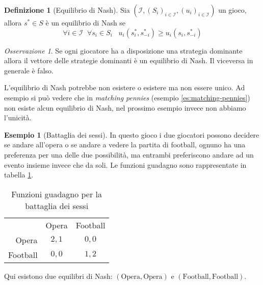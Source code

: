 \documentclass[a4paper]{article}
\theoremstyle{plain}
\theoremstyle{definition}
\newtheorem{mydef}[myteo]{Definizione}
\newtheorem{myes}[myteo]{Esempio}
\theoremstyle{remark}
\newtheorem{myoss}[myteo]{Osservazione}
\newcommand{\pa}[1]{\left(#1\right)}
\begin{document}
\begin{mydef}[Equilibrio di Nash]
  Sia  $\pa{\mathcal{I},\pa{S_i}_{i\in\mathcal{I}},
    \pa{u_i}_{i\in\mathcal{I}}}$ un gioco, allora  
  $s^* \in S$ è un equilibrio di Nash se
  \[ \forall i\in \mathcal{I}\;\; \forall s_i \in S_i \;\;\;
    u_i\pa{s^*_i,s^*_{-i}} \ge u_i\pa{s_i,s^*_{-i}} \]
\end{mydef}

\begin{myoss}
  Se ogni giocatore ha a disposizione una strategia dominante allora
  il vettore delle strategie dominanti è un equilibrio di Nash. Il
  viceversa in generale è falso.
\end{myoss}

L'equilibrio di Nash potrebbe non esistere o esistere ma non essere
unico. Ad esempio si può vedere che in \textit{matching pennies}
(esempio \ref{es:matching-pennies}) non esiste alcun equilibrio di
Nash, nel prossimo esempio invece non abbiamo l'unicità.

\begin{myes}[Battaglia dei sessi]
  In questo gioco i due giocatori possono decidere se andare all'opera
  o se andare a vedere la partita di football, ognuno ha una
  preferenza per una delle due possibilità, ma entrambi preferiscono
  andare ad un evento insieme invece che da soli. Le funzioni guadagno
  sono rappresentate in tabella \ref{tab:u1u2-sessi}.
  
  \begin{table}[!ht]
    \centering
    \begin{tabular}{rcc}
      & Opera & Football \\
      \cline{2-3}
      Opera & \multicolumn{1}{|c|}{$2,1$} & \multicolumn{1}{|c|}{$0,0$}  \\
      \cline{2-3}
      Football & \multicolumn{1}{|c|}{$0,0$} & \multicolumn{1}{|c|}{$1,2$}  \\
      \cline{2-3}
    \end{tabular}
    \caption{Funzioni guadagno per la battaglia dei sessi}
    \label{tab:u1u2-sessi}
  \end{table}
  
  Qui esistono due equilibri di Nash: $\pa{\text{Opera},\text{Opera}}$
  e $\pa{\text{Football},\text{Football}}$.
\end{myes}




\end{document}
